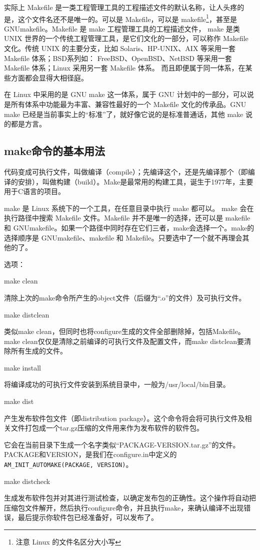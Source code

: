 实际上 Makefile 是一类工程管理工具的工程描述文件的默认名称，让人头疼的是，这个文件名还不是唯一的。可以是 Makefile，可以是 makefile\footnote{注意 Linux 的文件名区分大小写}，甚至是 GNUmakefile。Makefile 是 make 工程管理工具的工程描述文件， make 是类 UNIX 世界的一个传统工程管理工具，是它们文化的一部分，可以称作 Makefile 文化。传统 UNIX 的主要分支，比如 Solaris、HP-UNIX、AIX 等采用一套 Makefile 体系；BSD系列如： FreeBSD、OpenBSD、NetBSD 等采用一套 Makefile 体系；Linux 采用另一套 Makefile 体系。 而且即便属于同一体系，在某些方面都会显得大相径庭。

在 Linux 中采用的是 GNU make 这一体系，属于 GNU 计划中的一部分，可以说是所有体系中功能最为丰富、兼容性最好的一个 Makefile 文化的传承品。GNU make 已经是当前事实上的“标准”了，就好像它说的是标准普通话，其他  make 说的都是方言。



\subsection{make命令的基本用法}
代码变成可执行文件，叫做编译（compile）；先编译这个，还是先编译那个（即编译的安排），叫做构建（build）。Make是最常用的构建工具，诞生于1977年，主要用于C语言的项目。

make 是 Linux 系统下的一个工具，在任意目录中执行 make 都可以。 make 会在执行路径中搜索 Makefile 文件。Makefile 并不是唯一的选择，还可以是 makefile 和 GNUmakefile。如果一个路径中同时存在它们三者，make会选择一个。make的选择顺序是 GNUmakefile、makefile 和 Makefile。只要选中了一个就不再理会其他的了。

选项：






make clean

清除上次的make命令所产生的object文件（后缀为“.o”的文件）及可执行文件。

make distclean

类似make clean，但同时也将configure生成的文件全部删除掉，包括Makefile。
make clean仅仅是清除之前编译的可执行文件及配置文件，而make distclean要清除所有生成的文件。

make install

将编译成功的可执行文件安装到系统目录中，一般为/usr/local/bin目录。

make dist

产生发布软件包文件（即distribution package）。这个命令将会将可执行文件及相关文件打包成一个tar.gz压缩的文件用来作为发布软件的软件包。

它会在当前目录下生成一个名字类似“PACKAGE-VERSION.tar.gz”的文件。PACKAGE和VERSION，是我们在configure.in中定义的\verb*|AM_INIT_AUTOMAKE(PACKAGE, VERSION)|。

make distcheck

生成发布软件包并对其进行测试检查，以确定发布包的正确性。这个操作将自动把压缩包文件解开，然后执行configure命令，并且执行make，来确认编译不出现错误，最后提示你软件包已经准备好，可以发布了。





























